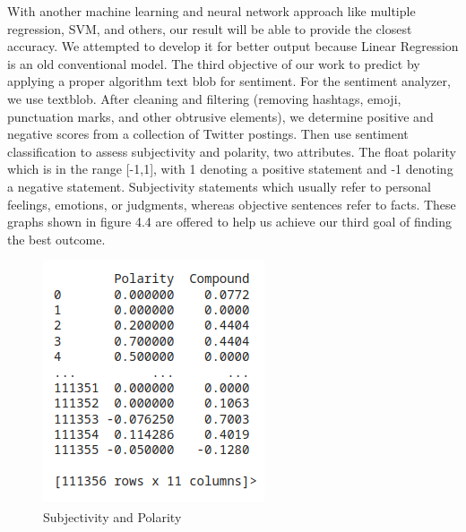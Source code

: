 With another machine learning and neural network approach like multiple regression, SVM, and others, our result will be able to provide the closest accuracy. We attempted to develop it for better output because Linear Regression is an old conventional model.
The third objective of our work to predict by applying a proper algorithm text blob for sentiment. For the sentiment analyzer, we use textblob. After cleaning and filtering (removing hashtags, emoji, punctuation marks, and other obtrusive elements), we determine positive and negative scores from a collection of Twitter postings. Then use sentiment classification to assess subjectivity and polarity, two attributes. The float polarity which is in the range [-1,1], with 1 denoting a positive statement and -1 denoting a negative statement. Subjectivity statements which usually refer to personal feelings, emotions, or judgments, whereas objective sentences refer to facts. These graphs shown in figure 4.4 are offered to help us achieve our third goal of finding the best outcome.\\
\begin{figure}[H]
    \centering
    \includegraphics[scale=.9]{img4/subpol.png}
    \caption{Subjectivity and Polarity}
    \label{fig:subpol}
\end{figure}

